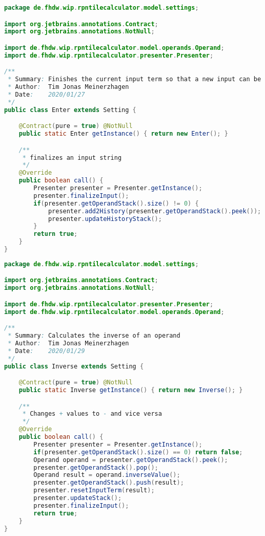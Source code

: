 \begin{lstlisting}[caption=Enter (Meinerzhagen),label=list:Enter,language=Java]
package de.fhdw.wip.rpntilecalculator.model.settings;

import org.jetbrains.annotations.Contract;
import org.jetbrains.annotations.NotNull;

import de.fhdw.wip.rpntilecalculator.model.operands.Operand;
import de.fhdw.wip.rpntilecalculator.presenter.Presenter;

/**
 * Summary: Finishes the current input term so that a new input can be created
 * Author:  Tim Jonas Meinerzhagen
 * Date:    2020/01/27
 */
public class Enter extends Setting {

    @Contract(pure = true) @NotNull
    public static Enter getInstance() { return new Enter(); }

    /**
     * finalizes an input string
     */
    @Override
    public boolean call() {
        Presenter presenter = Presenter.getInstance();
        presenter.finalizeInput();
        if(presenter.getOperandStack().size() != 0) {
            presenter.add2History(presenter.getOperandStack().peek());
            presenter.updateHistoryStack();
        }
        return true;
    }
}
\end{lstlisting}    

\begin{lstlisting}[caption=Inverse (Meinerzhagen),label=list:Inverse,language=Java]
package de.fhdw.wip.rpntilecalculator.model.settings;

import org.jetbrains.annotations.Contract;
import org.jetbrains.annotations.NotNull;

import de.fhdw.wip.rpntilecalculator.presenter.Presenter;
import de.fhdw.wip.rpntilecalculator.model.operands.Operand;

/**
 * Summary: Calculates the inverse of an operand
 * Author:  Tim Jonas Meinerzhagen
 * Date:    2020/01/29
 */
public class Inverse extends Setting {

    @Contract(pure = true) @NotNull
    public static Inverse getInstance() { return new Inverse(); }

    /**
     * Changes + values to - and vice versa
     */
    @Override
    public boolean call() {
        Presenter presenter = Presenter.getInstance();
        if(presenter.getOperandStack().size() == 0) return false;
        Operand operand = presenter.getOperandStack().peek();
        presenter.getOperandStack().pop();
        Operand result = operand.inverseValue();
        presenter.getOperandStack().push(result);
        presenter.resetInputTerm(result);
        presenter.updateStack();
        presenter.finalizeInput();
        return true;
    }
}
\end{lstlisting}    

